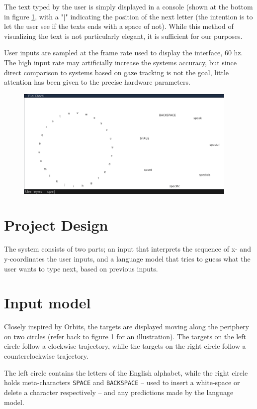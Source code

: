 \documentclass[a4paper, titlepage]{article}
\renewcommand{\%}{\scalebox{.9}{\oldpct}}
\begin{document}
The text typed by the user is simply displayed in a console (shown at the
bottom in figure \ref{fig:apparatus}, with a "$\vert$" indicating the position
of the next letter (the intention is to let the user see if the texts ends with
a space of not). While this method of visualizing the text is not particularly
elegant, it is sufficient for our purposes.

User inputs are sampled at the frame rate used to display the interface, 60 hz.
The high input rate may artificially increase the systems accuracy, but since
direct comparison to systems based on gaze tracking is not the goal, little
attention has been given to the precise hardware parameters.

\begin{figure}[htbp]
  \centering
    \includegraphics[width=0.95\textwidth]{screenshot.png}
  \caption{}
  \label{fig:apparatus}
\end{figure}

\section{Project Design}
The system consists of two parts; an input that interprets the sequence of x-
and y-coordinates the user inputs, and a language model that tries to guess what the user wants to type next, based on previous inputs.

\section{Input model}
Closely inspired by Orbits\cite{orbits}, the targets are displayed moving along
the periphery on two circles (refer back to figure \ref{fig:apparatus} for an
illustration). The targets on the left circle follow a clockwise trajectory,
while the targets on the right circle follow a counterclockwise trajectory.

The left circle contains the letters of the English alphabet, while the right
circle holds meta-characters \texttt{SPACE} and \texttt{BACKSPACE} -- used to
insert a white-space or delete a character respectively -- and any predictions
made by the language model.
\end{document}
